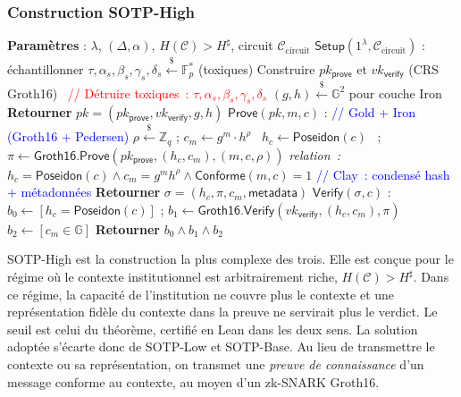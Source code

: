 \begin{sloppypar}
\subsubsection{Construction SOTP-High}
\label{subsubsec:construction_high}

\begin{algorithm}[H]
\caption{Construction de SOTP-High avec zk-SNARKs Groth16}
\label{alg:sotp_high}
\begin{algorithmic}[1]
\State \textbf{Param\`etres} : $\lambda$, $(\Delta, \alpha)$, $H(\mathcal{C}) > H^\sharp$, circuit $\mathcal{C}_{\text{circuit}}$
\State \textbf{$\mathsf{Setup}(1^\lambda, \mathcal{C}_{\text{circuit}})$} :
\State \quad \'echantillonner $\tau, \alpha_s, \beta_s, \gamma_s, \delta_s \xleftarrow{\$} \mathbb{F}_p^*$ (toxiques)
\State \quad Construire $pk_{\mathsf{prove}}$ et $vk_{\mathsf{verify}}$ (CRS Groth16)~\cite{Groth16,BCTV14}
\State \quad \textcolor{red}{// D\'etruire toxiques~: $\tau, \alpha_s, \beta_s, \gamma_s, \delta_s$}
\State \quad $(g, h) \xleftarrow{\$} \mathbb{G}^2$ pour couche Iron
\State \quad \textbf{Retourner} $pk = (pk_{\mathsf{prove}}, vk_{\mathsf{verify}}, g, h)$
\State \textbf{$\mathsf{Prove}(pk, m, c)$} :
\State \quad \textcolor{blue}{// Gold + Iron (Groth16 + Pedersen)}
\State \quad $\rho \xleftarrow{\$} \mathbb{Z}_q$ ;\; $c_m \leftarrow g^m \cdot h^\rho$~\cite{Pedersen91}
\State \quad $h_c \leftarrow \mathsf{Poseidon}(c)$~\cite{Poseidon2019,Grassi2021} ;\; $\pi \leftarrow \mathsf{Groth16.Prove}(pk_{\mathsf{prove}}, (h_c, c_m), (m, c, \rho))$
\State \quad \textit{relation~: $h_c = \mathsf{Poseidon}(c) \wedge c_m = g^m h^\rho \wedge \mathsf{Conforme}(m, c) = 1$}
\State \quad \textcolor{blue}{// Clay~: condens\'e hash + m\'etadonn\'ees}
\State \quad \textbf{Retourner} $\sigma = (h_c, \pi, c_m, \mathsf{metadata})$
\State \textbf{$\mathsf{Verify}(\sigma, c)$} :
\State \quad $b_0 \leftarrow [h_c = \mathsf{Poseidon}(c)]$ ;\; $b_1 \leftarrow \mathsf{Groth16.Verify}(vk_{\mathsf{verify}}, (h_c, c_m), \pi)$
\State \quad $b_2 \leftarrow [c_m \in \mathbb{G}]$
\State \quad \textbf{Retourner} $b_0 \wedge b_1 \wedge b_2$
\end{algorithmic}
\end{algorithm}

SOTP-High est la construction la plus complexe des trois. Elle est
con\c{c}ue pour le r\'egime o\`u le contexte institutionnel est
arbitrairement riche, $H(\mathcal{C}) > H^\sharp$. Dans ce r\'egime, la capacit\'e de
l'institution ne couvre plus le contexte et une repr\'esentation fid\`ele du contexte dans la
preuve ne servirait plus le verdict. Le seuil est celui du th\'eor\`eme,
certifi\'e en Lean dans les deux sens. La solution
adopt\'ee s'\'ecarte donc de SOTP-Low et SOTP-Base. Au lieu de transmettre le contexte ou sa repr\'esentation, on transmet une
\emph{preuve de connaissance} d'un message conforme au contexte, au moyen d'un zk-SNARK Groth16.


\end{sloppypar}
